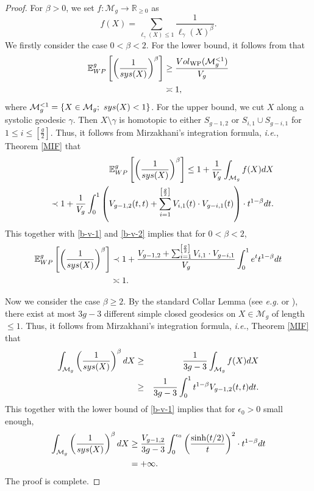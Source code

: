 \documentclass[11pt]{amsart}
\makeatletter
\newcommand{\M}{\mathcal{M}}
\newcommand{\sM}{\mathcal{M}}
\newcommand{\E}{\mathbb{E}_{\rm WP}^g}
\newcommand{\eg}{\textit{e.g.\@ }}
\newcommand{\ie}{\textit{i.e.\@}}
\def\sys{\mathop{\rm sys}}
\def\Vol{\mathop{\rm Vol}}
\theoremstyle{plain}
\newcommand{\be}{\begin{equation}}
\newcommand{\ene}{\end{equation}}
\newcommand{\beqar}{\begin{eqnarray*}}
\newcommand{\eeqar}{\end{eqnarray*}}
\theoremstyle{definition}
\theoremstyle{remark}
\makeatother
\begin{document}
\begin{proof}
For $\beta>0$, we set $f:\M_g\to \mathbb{R}_{\geq 0}$ as $$
 f(X)=\sum_{\ell_{\gamma}(X)\leq 1}\frac{1}{\ell_\gamma(X)^\beta}.
 $$
We firstly consider the case \underline{$0<\beta<2$}. For the lower bound, it follows from \cite[Theorem 4.2]{mirzakhani2013growth} that
\be
\begin{aligned}
\E\left[ 
  \left( \frac{1}{\sys(X)} \right)^\beta\right]&\geq \frac{\Vol_{\mathrm{WP}}(\sM_g^{<1})}{V_g}\\
&\asymp 1, 
\end{aligned}
\ene
where $\sM_g^{<1}=\{X\in \sM_g; \ \sys(X)<1\}$. For the upper bound, we cut $X$ along a systolic geodesic $\gamma$. Then $X\setminus \gamma$ is homotopic to either $S_{g-1,2}$ or $S_{i,1}\cup S_{g-i,1}$ for $1\leq i\leq \left[\frac{g}{2}\right]$. Thus, it follows from Mirzakhani's integration formula, \ie, Theorem \ref{MIF} that
\beqar
&&\E\left[\left(\frac{1}{\sys(X)}\right)^\beta\right]\leq 1+\frac{1}{V_g}\int_{\M_g}f(X)dX\\
&&\prec 1+\frac{1}{V_g}\int_{0}^1\left(V_{g-1,2}(t,t) +\sum_{i=1}^{\left[\frac{g}{2}\right]}V_{i,1}(t)\cdot V_{g-i,1}(t)  \right)\cdot t^{1-\beta}dt.
\eeqar
This together with \eqref{b-v-1} and \eqref{b-v-2} implies that for $0<\beta<2$,
\be
\begin{aligned}
\E\left[\left(\frac{1}{\sys(X)}\right)^\beta\right]&\prec  1+\frac{V_{g-1,2}+\sum_{i=1}^{\left[\frac{g}{2}\right]}V_{i,1}\cdot V_{g-i,1}}{V_g}\int_{0}^1e^t t^{1-\beta}dt\\
&\asymp 1. 
\end{aligned}
\ene

\noindent Now we consider the case \underline{$\beta\geq 2$}. By the standard Collar Lemma (see \eg \cite{keen1974collars} or \cite{buser2010geometry}), there exist at most $3g-3$ different simple closed geodesics on $X\in\M_g$ of length $\leq 1$. Thus,  it follows from Mirzakhani's integration formula, \ie, Theorem \ref{MIF} that
\beqar
\int_{\M_g}\left(\frac{1}{\sys(X)}\right)^\beta dX &\geq& \frac{1}{3g-3}  \int_{\M_g} f(X)dX\\
&\geq & \frac{1}{3g-3} \int_0^1 t^{1-\beta} V_{g-1,2}(t,t)dt.
\eeqar
This together with the lower bound of \eqref{b-v-1} implies that for $\epsilon_0>0$ small enough,
\be
\begin{aligned}
\int_{\M_g}\left(\frac{1}{\sys(X)}\right)^\beta dX &\geq \frac{V_{g-1,2}}{3g-3} \int_0^{\epsilon_0} \left(\frac{\sinh(t/2)}{t} \right)^2\cdot t^{1-\beta}dt\\
&= +\infty.
\end{aligned}
\ene
The proof is complete.
\end{proof}
\end{document}
